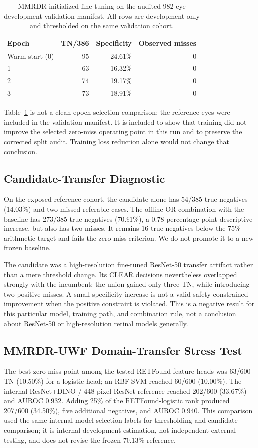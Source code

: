 \documentclass{ieeeaccess}
\begin{document}
\begin{table}[t]
\centering
\caption{MMRDR-initialized fine-tuning on the audited 982-eye development validation manifest. All rows are development-only and thresholded on the same validation cohort.}
\label{tab:ft}
\begin{tabular}{lrrr}
\toprule
Epoch & TN/386 & Specificity & Observed misses \\
\midrule
Warm start (0) & 95 & 24.61\% & 0 \\
1 & 63 & 16.32\% & 0 \\
2 & 74 & 19.17\% & 0 \\
3 & 73 & 18.91\% & 0 \\
\bottomrule
\end{tabular}
\end{table}

Table~\ref{tab:ft} is not a clean epoch-selection comparison: the reference eyes were included in the validation manifest. It is included to show that training did not improve the selected zero-miss operating point in this run and to preserve the corrected split audit. Training loss reduction alone would not change that conclusion.

\subsection{Candidate-Transfer Diagnostic}
On the exposed reference cohort, the candidate alone has 54/385 true negatives (14.03\%) and two missed referable cases. The offline OR combination with the baseline has 273/385 true negatives (70.91\%), a 0.78-percentage-point descriptive increase, but also has two misses. It remains 16 true negatives below the 75\% arithmetic target and fails the zero-miss criterion. We do not promote it to a new frozen baseline.

The candidate was a high-resolution fine-tuned ResNet-50 transfer artifact rather than a mere threshold change. Its CLEAR decisions nevertheless overlapped strongly with the incumbent: the union gained only three TN, while introducing two positive misses. A small specificity increase is not a valid safety-constrained improvement when the positive constraint is violated. This is a negative result for this particular model, training path, and combination rule, not a conclusion about ResNet-50 or high-resolution retinal models generally.

\subsection{MMRDR-UWF Domain-Transfer Stress Test}
The best zero-miss point among the tested RETFound feature heads was 63/600 TN (10.50\%) for a logistic head; an RBF-SVM reached 60/600 (10.00\%). The internal ResNet+DINO / 448-pixel ResNet reference reached 202/600 (33.67\%) and AUROC 0.932. Adding 25\% of the RETFound-logistic rank produced 207/600 (34.50\%), five additional negatives, and AUROC 0.940. This comparison used the same internal model-selection labels for thresholding and candidate comparison; it is internal development estimation, not independent external testing, and does not revise the frozen 70.13\% reference.
\end{document}
